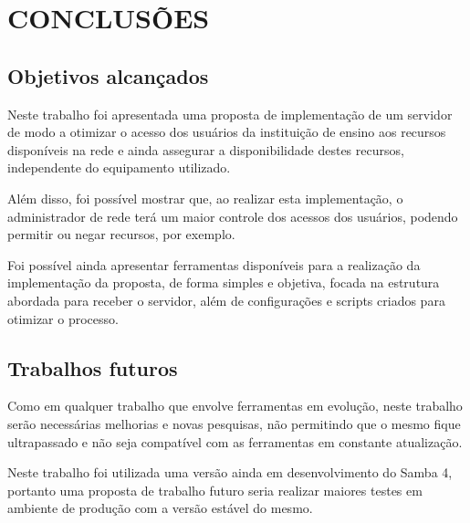 \chapter{CONCLUSÕES}

\section{Objetivos alcançados}

Neste trabalho foi apresentada uma proposta de implementação de um servidor de modo a otimizar o acesso dos usuários da instituição de ensino aos recursos disponíveis na rede e ainda assegurar a disponibilidade destes recursos, independente do equipamento utilizado.

Além disso, foi possível mostrar que, ao realizar esta implementação, o administrador de rede terá um maior controle dos acessos dos usuários, podendo permitir ou negar recursos, por exemplo.

Foi possível ainda apresentar ferramentas disponíveis para a realização da implementação da proposta, de forma simples e objetiva, focada na estrutura abordada para receber o servidor, além de configurações e scripts criados para otimizar o processo.

\section{Trabalhos futuros}

Como em qualquer trabalho que envolve ferramentas em evolução, neste trabalho serão necessárias melhorias e novas pesquisas, não permitindo que o mesmo fique ultrapassado e não seja compatível com as ferramentas em constante atualização.

Neste trabalho foi utilizada uma versão ainda em desenvolvimento do Samba 4, portanto uma proposta de trabalho futuro seria realizar maiores testes em ambiente de produção com a versão estável do mesmo.
